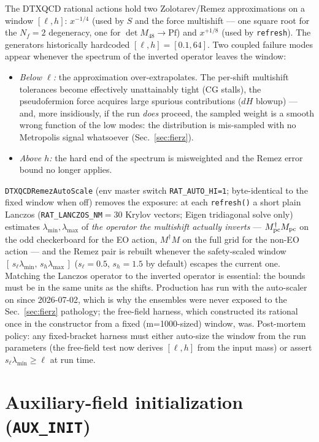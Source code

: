 \documentclass[11pt]{article}
\begin{document}
The DTXQCD rational actions hold two Zolotarev/Remez approximations on a
window $[\ell,h]$: $x^{-1/4}$ (used by $S$ and the force multishift ---
one square root for the $N_f=2$ degeneracy, one for
$\det M_{48}\to\mathrm{Pf}$) and $x^{+1/8}$ (used by \texttt{refresh}).
The generators historically hardcoded $[\ell,h]=[0.1,64]$.  Two coupled
failure modes appear whenever the spectrum of the inverted operator leaves
the window:
\begin{itemize}
\item \emph{Below $\ell$:} the approximation over-extrapolates.  The
per-shift multishift tolerances become effectively unattainably tight (CG
stalls), the pseudofermion force acquires large spurious contributions
($dH$ blowup) --- and, more insidiously, if the run \emph{does} proceed,
the sampled weight is a smooth wrong function of the low modes: the
distribution is mis-sampled with no Metropolis signal whatsoever
(Sec.~\ref{sec:fierz}).
\item \emph{Above $h$:} the hard end of the spectrum is misweighted and
the Remez error bound no longer applies.
\end{itemize}

\texttt{DTXQCDRemezAutoScale} (env master switch \texttt{RAT\_AUTO\_HI=1};
byte-identical to the fixed window when off) removes the exposure: at each
\texttt{refresh()} a short plain Lanczos (\texttt{RAT\_LANCZOS\_NM}$=30$
Krylov vectors; Eigen tridiagonal solve only) estimates
$\lambda_{\min},\lambda_{\max}$ of \emph{the operator the multishift
actually inverts} --- $M_{\rm pc}^{\dagger}M_{\rm pc}$ on the odd
checkerboard for the EO action, $M^{\dagger}M$ on the full grid for the
non-EO action --- and the Remez pair is rebuilt whenever the safety-scaled
window $[\,s_{\ell}\lambda_{\min},\,s_{h}\lambda_{\max}\,]$
($s_{\ell}=0.5$, $s_{h}=1.5$ by default) escapes the current one.  Matching
the Lanczos operator to the inverted operator is essential: the bounds must
be in the same units as the shifts.  Production has run with the
auto-scaler on since 2026-07-02, which is why the ensembles were never
exposed to the Sec.~\ref{sec:fierz} pathology; the free-field harness,
which constructed its rational once in the constructor from a fixed
(m=1000-sized) window, was.  Post-mortem policy: any fixed-bracket harness
must either auto-size the window from the run parameters (the free-field
test now derives $[\ell,h]$ from the input mass) or assert
$s_{\ell}\lambda_{\min}\ge\ell$ at run time.

\section{Auxiliary-field initialization (\texttt{AUX\_INIT})}
\label{sec:auxinit}
\end{document}
